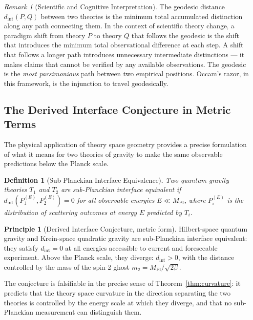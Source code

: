 \documentclass[12pt,a4paper]{article}
\newtheorem{definition}[theorem]{Definition}
\theoremstyle{remark}
\newtheorem{remark}{Remark}[section]
\theoremstyle{definition}
\newtheorem{principle}{Principle}[section]
\begin{document}
\begin{remark}[Scientific and Cognitive Interpretation]
The geodesic distance $d_{\mathrm{int}}(P,Q)$ between two theories is
the minimum total accumulated distinction along any path connecting them.
In the context of scientific theory change, a paradigm shift from theory
$P$ to theory $Q$ that follows the geodesic is the shift that introduces
the minimum total observational difference at each step. A shift that
follows a longer path introduces unnecessary intermediate distinctions ---
it makes claims that cannot be verified by any available observations.
The geodesic is the \emph{most parsimonious} path between two empirical
positions. Occam's razor, in this framework, is the injunction to travel
geodesically.
\end{remark}

\subsection{The Derived Interface Conjecture in Metric Terms}

The physical application of theory space geometry provides a precise
formulation of what it means for two theories of gravity to make the
same observable predictions below the Planck scale.

\begin{definition}[Sub-Planckian Interface Equivalence]
Two quantum gravity theories $T_1$ and $T_2$ are \emph{sub-Planckian
interface equivalent} if $d_{\mathrm{int}}(P_1^{(E)}, P_2^{(E)}) = 0$
for all observable energies $E \ll M_{\mathrm{Pl}}$, where $P_i^{(E)}$
is the distribution of scattering outcomes at energy $E$ predicted by
$T_i$.
\end{definition}

\begin{principle}[Derived Interface Conjecture, metric form]
Hilbert-space quantum gravity and Krein-space quadratic gravity are
sub-Planckian interface equivalent: they satisfy $d_{\mathrm{int}} = 0$
at all energies accessible to current and foreseeable experiment. Above
the Planck scale, they diverge: $d_{\mathrm{int}} > 0$, with the distance
controlled by the mass of the spin-2 ghost $m_2 = M_{\mathrm{Pl}}/\sqrt{2\beta}$.
\end{principle}

The conjecture is falsifiable in the precise sense of Theorem~\ref{thm:curvature}:
it predicts that the theory space curvature in the direction separating
the two theories is controlled by the energy scale at which they diverge,
and that no sub-Planckian measurement can distinguish them.
\end{document}
